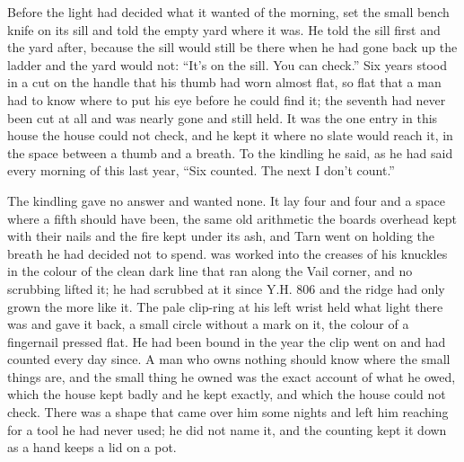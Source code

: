 
Before the light had decided what it wanted of the morning,  set the small bench knife on its sill and told the empty yard where it was. He told the sill first and the yard after, because the sill would still be there when he had gone back up the ladder and the yard would not: “It’s on the sill. You can check.” Six years stood in a cut on the handle that his thumb had worn almost flat, so flat that a man had to know where to put his eye before he could find it; the seventh had never been cut at all and was nearly gone and still held. It was the one entry in this house the house could not check, and he kept it where no slate would reach it, in the space between a thumb and a breath. To the kindling he said, as he had said every morning of this last year, “Six counted. The next I don’t count.”

The kindling gave no answer and wanted none. It lay four and four and a space where a fifth should have been, the same old arithmetic the boards overhead kept with their nails and the fire kept under its ash, and Tarn went on holding the breath he had decided not to spend.  was worked into the creases of his knuckles in the colour of the clean dark line that ran along the Vail corner, and no scrubbing lifted it; he had scrubbed at it since Y.H. 806 and the ridge had only grown the more like it. The pale clip-ring at his left wrist held what light there was and gave it back, a small circle without a mark on it, the colour of a fingernail pressed flat. He had been bound in the year the clip went on and had counted every day since. A man who owns nothing should know where the small things are, and the small thing he owned was the exact account of what he owed, which the house kept badly and he kept exactly, and which the house could not check. There was a shape that came over him some nights and left him reaching for a tool he had never used; he did not name it, and the counting kept it down as a hand keeps a lid on a pot.


